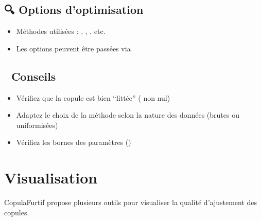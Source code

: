 \documentclass[letterpaper,18pt,english]{sphinxhowto}
\begin{document}
\subsection{🔍 Options d’optimisation}
\label{\detokenize{pages/fitting:options-d-optimisation}}\begin{itemize}
\item {} 
\sphinxAtStartPar
Méthodes utilisées : , , , etc.

\item {} 
\sphinxAtStartPar
Les options peuvent être passées via 

\end{itemize}


\subsection{📌 Conseils}
\label{\detokenize{pages/fitting:conseils}}\begin{itemize}
\item {} 
\sphinxAtStartPar
Vérifiez que la copule est bien “fittée” ( non nul)

\item {} 
\sphinxAtStartPar
Adaptez le choix de la méthode selon la nature des données (brutes ou uniformisées)

\item {} 
\sphinxAtStartPar
Vérifiez les bornes des paramètres ()

\end{itemize}

\sphinxstepscope


\section{Visualisation}
\label{\detokenize{pages/visualization:visualisation}}\label{\detokenize{pages/visualization:visualization}}\label{\detokenize{pages/visualization::doc}}
\sphinxAtStartPar
CopulaFurtif propose plusieurs outils pour visualiser la qualité d’ajustement des copules.
\end{document}
